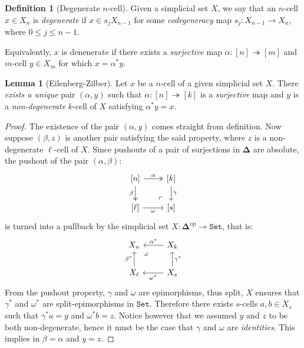 \documentclass[11pt, reqno]{amsart}
\theoremstyle{definition}
\newtheorem{lemma}[theorem]{Lemma}
\newtheorem{definition}[theorem]{Definition}
\renewcommand{\leq}{\leqslant}
\newcommand{\epi}{\twoheadrightarrow}
\newcommand{\catfont}{\texttt}
\newcommand{\op}{\mathrm{op}}
\newcommand{\Set}{{\catfont{Set}}}          %
\newcommand{\Splx}{{\mathbf{\Delta}}}           %
\begin{document}
\begin{definition}[Degenerate \(n\)-cell]
\label{def:degenerate-n-cell}
Given a simplicial set \(X\), we say that an \(n\)-cell \(x \in X_n\) is
\emph{degenerate} if \(x \in s_j X_{n-1}\) for some \emph{codegeneracy} map
\(s_j: X_{n-1} \to X_n\), where \(0 \leq j \leq n-1\).

Equivalently, \(x\) is denenerate if there exists a \emph{surjective} map
\(\alpha: [n] \epi [m]\) and \(m\)-cell \(y \in X_m\) for which
\(x = \alpha^{*} y\).
\end{definition}

\begin{lemma}[Eilenberg-Zilber]
\label{lem:Eilenberg-Zilber}
Let \(x\) be a \(n\)-cell of a given simplicial set \(X\). There \emph{exists
  a unique} pair \((\alpha, y)\) such that \(\alpha: [n] \epi [k]\) is a
\emph{surjective} map and \(y\) is a \emph{non-degenerate} \(k\)-cell of
\(X\) satisfying \(\alpha^{*} y = x\).
\end{lemma}

\begin{proof}
The existence of the pair \((\alpha, y)\) comes straight from definition. Now
suppose \((\beta, z)\) is another pair satisfying the said property, where \(z\)
is a non-degenerate \(\ell\)-cell of \(X\). Since pushouts of a pair of
surjections in \(\Splx\) are absolute, the pushout of the pair
\((\alpha, \beta)\):
\[
\begin{tikzcd}
{[n]} \ar[r, two heads, "\alpha"]
\ar[d, two heads, "\beta"']
\ar[dr, phantom, "\ulcorner", very near end]
&{[k]} \ar[d, "\gamma"] \\
{[\ell]} \ar[r, "\omega"'] &{[s]}
\end{tikzcd}
\]
is turned into a pullback by the simplicial set \(X: \Splx^{\op} \to \Set\),
that is:
\[
\begin{tikzcd}
X_n \ar[rd, phantom, very near start, "\lrcorner"]
&X_k \ar[l, "\alpha^{*}"']
\\
X_{\ell} \ar[u, "\beta^{*}"]
&X_s \ar[u, "\gamma^{*}"'] \ar[l, "\omega^{*}"]
\end{tikzcd}
\]
From the pushout property, \(\gamma\) and \(\omega\) are epimorphisms, thus
split, \(X\) ensures that \(\gamma^{*}\) and \(\omega^{*}\) are
split-epimorphisms in \(\Set\). Therefore there exists \(s\)-cells
\(a, b \in X_s\) such that \(\gamma^{*} a = y\) and \(\omega^{*} b = z\). Notice
however that we assumed \(y\) and \(z\) to be both non-degenerate, hence it must
be the case that \(\gamma\) and \(\omega\) are \emph{identities}. This implies
in \(\beta = \alpha\) and \(y = z\).
\end{proof}
\end{document}
